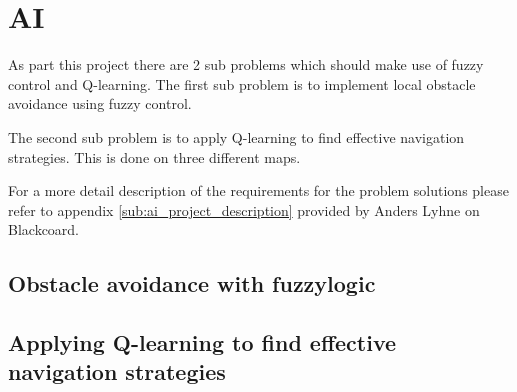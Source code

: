\documentclass[../../Main.tex]{subfiles}
\begin{document}
\section{AI}%
\label{sec:ai}
As part this project there are 2 sub problems which should make use of fuzzy control
and Q-learning.
The first sub problem is to implement local obstacle avoidance using fuzzy control.

The second sub problem is to apply Q-learning to find effective navigation strategies.
This is done on three different maps.

For a more detail description of the requirements for the problem solutions please refer to appendix
\ref{sub:ai_project_description} provided by Anders Lyhne on Blackcoard.

\subsection{Obstacle avoidance with fuzzylogic}%
\label{sec:obstacle_avoidance_with_fuzzylogic}


\subsection{Applying Q-learning to find effective navigation strategies}%
\label{sub:applying_q_learning_to_effective_navigation_strategies}


	
\end{document}
